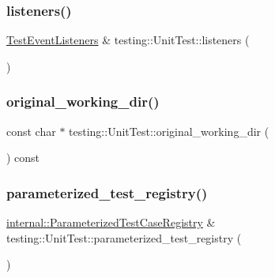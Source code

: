 \subsubsection{\texorpdfstring{listeners()}{listeners()}}
{\footnotesize\ttfamily \mbox{\hyperlink{classtesting_1_1TestEventListeners}{Test\+Event\+Listeners}} \& testing\+::\+Unit\+Test\+::listeners (\begin{DoxyParamCaption}{ }\end{DoxyParamCaption})}

\mbox{\label{classtesting_1_1UnitTest_af6809b7747785c80f7a2f31f6b39b152}} 
\subsubsection{\texorpdfstring{original\_working\_dir()}{original\_working\_dir()}}
{\footnotesize\ttfamily const char $\ast$ testing\+::\+Unit\+Test\+::original\+\_\+working\+\_\+dir (\begin{DoxyParamCaption}{ }\end{DoxyParamCaption}) const}

\mbox{\label{classtesting_1_1UnitTest_a8f9c5d0d9f1b6d23c94070944a43c550}} 
\subsubsection{\texorpdfstring{parameterized\_test\_registry()}{parameterized\_test\_registry()}}
{\footnotesize\ttfamily \mbox{\hyperlink{classtesting_1_1internal_1_1ParameterizedTestCaseRegistry}{internal\+::\+Parameterized\+Test\+Case\+Registry}} \& testing\+::\+Unit\+Test\+::parameterized\+\_\+test\+\_\+registry (\begin{DoxyParamCaption}{ }\end{DoxyParamCaption})}

\mbox{\label{classtesting_1_1UnitTest_a7c9b327bc14cb8a282c789dc6513a55b}} 
